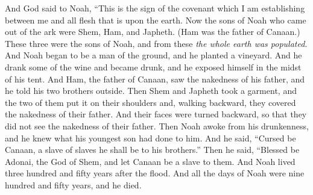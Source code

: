 \begin{biblechapter}
\verse And God said to Noah, “This is the sign of the covenant which I am establishing between me and all flesh that is upon the earth.
 Now the sons of Noah who came out of the ark were Shem, Ham, and Japheth. (Ham was the father of Canaan.)
\verse These three were the sons of Noah, and from these \textit{the whole earth was populated}.
\verse And Noah began to be a man of the ground, and he planted a vineyard.
\verse And he drank some of the wine and became drunk, and he exposed himself in the midst of his tent.
\verse And Ham, the father of Canaan, saw the nakedness of his father, and he told his two brothers outside.
\verse Then Shem and Japheth took a garment, and the two of them put it on their shoulders and, walking backward, they covered the nakedness of their father. And their faces were turned backward, so that they did not see the nakedness of their father.
\verse Then Noah awoke from his drunkenness, and he knew what his youngest son had done to him.
\verse And he said, “Cursed be Canaan, 
a slave of slaves he shall be to his brothers.”
\verse Then he said,
\verse “Blessed be Adonai, the God of Shem, 
and let Canaan be a slave to them.
\verse And Noah lived three hundred and fifty years after the flood.
\verse And all the days of Noah were nine hundred and fifty years, and he died.
\end{biblechapter}

